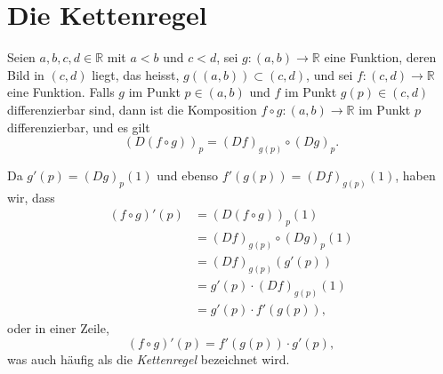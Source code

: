 \documentclass[../main.tex]{subfiles}
\begin{document}
\section{Die Kettenregel}

\begin{chainrule}
Seien
$a, b, c, d \in \mathbb{R}$ mit $a < b$ und $c < d$,
sei $g \colon (a, b) \to \mathbb{R}$
eine Funktion,
deren Bild in $(c, d)$ liegt, das heisst,
$g((a, b)) \subset (c, d)$,
und sei $f \colon (c, d) \to \mathbb{R}$ eine Funktion.
Falls $g$ im Punkt $p \in (a, b)$ und $f$
im Punkt $g(p) \in (c, d)$ differenzierbar sind,
dann ist die Komposition
$f \circ g \colon (a, b) \to \mathbb{R}$
im Punkt $p$ differenzierbar, und es gilt
\[
  {(D(f \circ g))}_p = {(Df)}_{g(p)} \circ {(Dg)}_p.
\]
\end{chainrule}

\begin{remark}
  Da $g'(p) = {(Dg)}_p(1)$ und
  ebenso $f'(g(p)) = {(Df)}_{g(p)}(1)$,
  haben wir, dass
  \begin{align*}
    (f \circ g)'(p)
    & = {(D(f \circ g))}_p(1) \\
    & = {(Df)}_{g(p)} \circ {(Dg)}_p(1) \\
    & = {(Df)}_{g(p)}(g'(p)) \\
    & = g'(p) \cdot {(Df)}_{g(p)}(1) \\
    & = g'(p) \cdot f'(g(p)),
  \end{align*}
  oder in einer Zeile,
  \[
    (f \circ g)'(p) = f'(g(p)) \cdot g'(p),
  \]
  was auch häufig als die \emph{Kettenregel}
  bezeichnet wird.
\end{remark}
\end{document}
